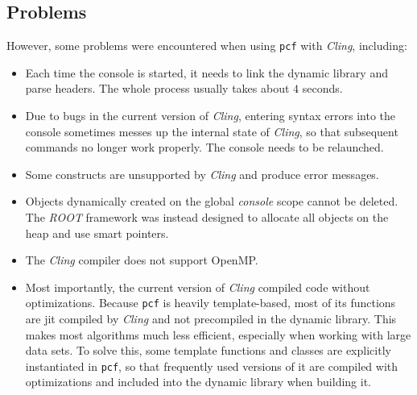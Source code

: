 \subsection{Problems}
However, some problems were encountered when using \texttt{pcf} with \emph{Cling}, including:
\begin{itemize}
\item Each time the console is started, it needs to link the dynamic library and parse headers. The whole process usually takes about $4$ seconds.
\item Due to bugs in the current version of \emph{Cling}, entering syntax errors into the console sometimes messes up the internal state of \emph{Cling}, so that subsequent commands no longer work properly. The console needs to be relaunched.
\item Some \cpp{} constructs are unsupported by \emph{Cling} and produce error messages.
\item Objects dynamically created on the global \emph{console} scope cannot be deleted. The \emph{ROOT} framework was instead designed to allocate all objects on the heap and use smart pointers.
\item The \emph{Cling} compiler does not support OpenMP.
\item Most importantly, the current version of \emph{Cling} compiled code without optimizations. Because \texttt{pcf} is heavily template-based, most of its functions are \gls{jit} compiled by \emph{Cling} and not precompiled in the dynamic library. This makes most algorithms much less efficient, especially when working with large data sets. To solve this, some template functions and classes are explicitly instantiated in \texttt{pcf}, so that frequently used versions of it are compiled with optimizations and included into the dynamic library when building it.
\end{itemize}